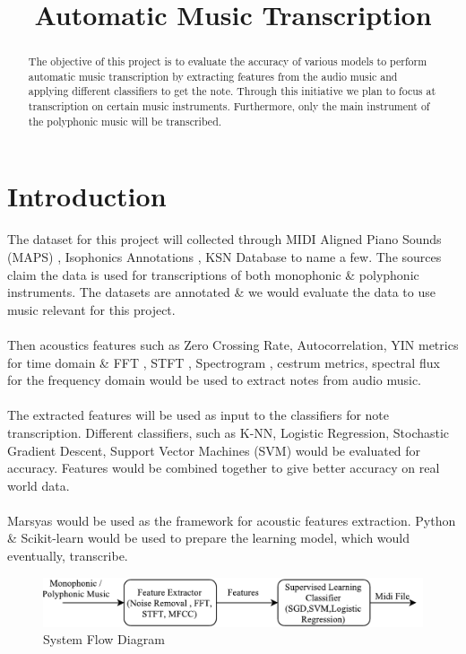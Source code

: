 \documentclass{article}
\title{Automatic Music Transcription \conferenceyear}
\begin{document}
%
\maketitle
%
\begin{abstract}
The objective of this project is to evaluate the accuracy of various models to perform automatic music transcription by extracting features from the audio music and applying different classifiers to get the note. Through this initiative we plan to focus at transcription on certain music instruments. Furthermore, only the main instrument of the polyphonic music will be transcribed.
\end{abstract}
%
\section{Introduction}\label{sec:introduction}
The dataset for this project will collected through MIDI Aligned Piano Sounds (MAPS) , Isophonics Annotations , KSN Database to name a few. The sources claim the data is used for transcriptions of both monophonic \& polyphonic instruments. The datasets are annotated \& we would evaluate the data to use music relevant for this project.  \\\\
Then acoustics features such as Zero Crossing Rate, Autocorrelation, YIN metrics for time domain \& FFT , STFT , Spectrogram , cestrum metrics, spectral flux for the frequency domain would be used to extract notes from audio music. \\\\
The extracted features will be used as input to the classifiers for note transcription. Different classifiers, such as K-NN, Logistic Regression, Stochastic Gradient Descent, Support Vector Machines (SVM) would be evaluated for accuracy. Features would be combined together to give better accuracy on real world data.\\
\\
Marsyas would be used as the framework for acoustic features extraction. Python \& Scikit-learn would be used to prepare the learning model, which would eventually, transcribe.  

\begin{figure}
\includegraphics[scale=.55]{System_Flow_Diagram}
\\System Flow Diagram
\end{figure}
\end{document}
